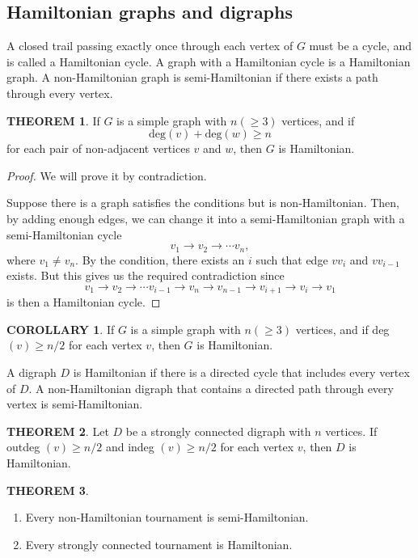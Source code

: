 \documentclass[a4paper,11pt]{article}%
\theoremstyle{remark}
\theoremstyle{definition}
\newtheorem{theorem}{THEOREM}[section]
\theoremstyle{definition}
\newtheorem{corollary}{COROLLARY}[section]
\theoremstyle{definition}
\theoremstyle{definition}
\theoremstyle{plain}
\theoremstyle{definition}
\begin{document}
\subsection{Hamiltonian graphs and digraphs}
A closed trail passing exactly once through each vertex of $G$ must be a cycle,
and is called a Hamiltonian cycle. A graph with a Hamiltonian cycle is a Hamiltonian graph.
A non-Hamiltonian graph is semi-Hamiltonian if there exists a path through 
every vertex.
\begin{theorem}
   If $G$ is a simple graph with $n(\geq 3)$ vertices, and if 
   \[\text{deg}(v)+\text{deg}(w)\geq n\]
   for each pair of non-adjacent vertices $v$ and $w$, then $G$ is Hamiltonian. 
\end{theorem}
\begin{proof}
    We will prove it by contradiction.

    Suppose there is a graph satisfies the conditions but is 
    non-Hamiltonian. Then, by adding enough edges, we can change it 
    into a semi-Hamiltonian graph with a semi-Hamiltonian cycle 
    \[v_1\rightarrow v_2\rightarrow\cdots v_n,\]
    where $v_1\neq v_n$. By the condition, there exists an $i$ such that 
    edge $vv_i$ and $vv_{i-1}$ exists. But this gives us the required 
    contradiction since 
    \[v_1\rightarrow v_2\rightarrow\cdots v_{i-1}\rightarrow v_n\rightarrow v_{n-1}\rightarrow v_{i+1}\rightarrow v_i\rightarrow v_1\]
    is then a Hamiltonian cycle.
\end{proof}
\begin{corollary}
   If $G$ is a simple graph with $n(\geq 3)$ vertices, and if 
   deg $(v)\geq n/2$ for each vertex $v$, then $G$ is Hamiltonian.
\end{corollary}
A digraph $D$ is Hamiltonian if there is a directed cycle that includes every 
vertex of $D$. A non-Hamiltonian digraph that contains a directed path through 
every vertex is semi-Hamiltonian.
\begin{theorem}
    Let $D$ be a strongly connected digraph with $n$ vertices. 
    If outdeg $(v)\geq n/2$ and indeg $(v)\geq n/2$ for each vertex $v$,
    then $D$ is Hamiltonian.
\end{theorem}
\begin{theorem}
    \begin{enumerate}
        \item Every non-Hamiltonian tournament is semi-Hamiltonian.
        \item Every strongly connected tournament is Hamiltonian.
    \end{enumerate}
\end{theorem}
\end{document}
